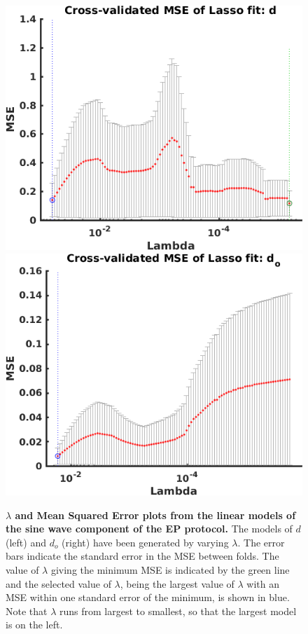 \documentclass[11pt,a4paper,oneside]{article}
\begin{document}
\begin{figure}[hb]
\begin{center}
\includegraphics[scale=0.42]{Figures/LASSO_EP_AP_full_lambda_d.png}
\includegraphics[scale=0.42]{Figures/LASSO_EP_AP_full_lambda_od.png}
\caption{\textbf{$\lambda$ and Mean Squared Error plots from the linear models of the sine wave component of the EP protocol.} The models of $d$ (left) and $d_o$ (right) have been generated by varying $\lambda$. The error bars indicate the standard error in the MSE between folds. The value of $\lambda$ giving the minimum MSE is indicated by the green line and the selected value of $\lambda$, being the largest value of $\lambda$ with an MSE within one standard error of the minimum, is shown in blue. Note that $\lambda$ runs from largest to smallest, so that the largest model is on the left.}
\label{Fig_LASSO_EP_AP_full_lambda}
\end{center}
\end{figure}
\end{document}
